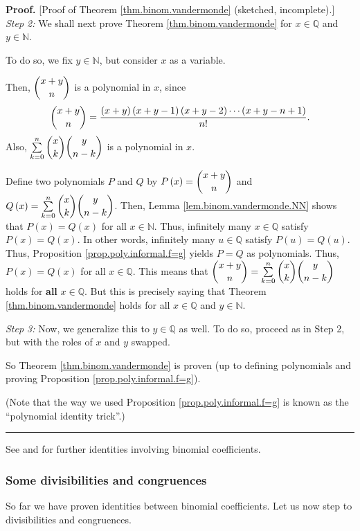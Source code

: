 \documentclass[numbers=enddot,12pt,final,onecolumn,notitlepage]{scrartcl}%
\numberwithin{exer}{subsection}
\theoremstyle{definition}
\newenvironment{proof}[1][Proof]{\noindent\textbf{#1.} }{\ \rule{0.5em}{0.5em}}
\let\sumnonlimits\sum
\renewcommand{\sum}{\sumnonlimits\limits}
\begin{document}
\begin{proof}
[Proof of Theorem \ref{thm.binom.vandermonde} (sketched, incomplete).]%
\textit{Step 2:} We shall next prove Theorem \ref{thm.binom.vandermonde} for
$x\in\mathbb{Q}$ and $y\in\mathbb{N}$.

To do so, we fix $y\in\mathbb{N}$, but consider $x$ as a variable.

Then, $\dbinom{x+y}{n}$ is a polynomial in $x$, since%
\[
\dbinom{x+y}{n}=\dfrac{\left(  x+y\right)  \left(  x+y-1\right)  \left(
x+y-2\right)  \cdots\left(  x+y-n+1\right)  }{n!}.
\]
Also, $\sum\limits_{k=0}^{n}\dbinom{x}{k}\dbinom{y}{n-k}$ is a polynomial in
$x$.

Define two polynomials $P$ and $Q$ by $P\left(  x\right)  =\dbinom{x+y}{n}$
and $Q\left(  x\right)  =\sum_{k=0}^{n}\dbinom{x}{k}\dbinom{y}{n-k}$. Then,
Lemma \ref{lem.binom.vandermonde.NN} shows that $P\left(  x\right)  =Q\left(
x\right)  $ for all $x\in\mathbb{N}$. Thus, infinitely many $x\in\mathbb{Q}$
satisfy $P\left(  x\right)  =Q\left(  x\right)  $. In other words, infinitely
many $u\in\mathbb{Q}$ satisfy $P\left(  u\right)  =Q\left(  u\right)  $. Thus,
Proposition \ref{prop.poly.informal.f=g} yields $P=Q$ as polynomials. Thus,
$P\left(  x\right)  =Q\left(  x\right)  $ for all $x\in\mathbb{Q}$. This means
that $\dbinom{x+y}{n}=\sum\limits_{k=0}^{n}\dbinom{x}{k}\dbinom{y}{n-k}$ holds
for \textbf{all} $x\in\mathbb{Q}$. But this is precisely saying that Theorem
\ref{thm.binom.vandermonde} holds for all $x\in\mathbb{Q}$ and $y\in
\mathbb{N}$.

\textit{Step 3:} Now, we generalize this to $y\in\mathbb{Q}$ as well. To do
so, proceed as in Step 2, but with the roles of $x$ and $y$ swapped.

So Theorem \ref{thm.binom.vandermonde} is proven (up to defining polynomials
and proving Proposition \ref{prop.poly.informal.f=g}).

(Note that the way we used Proposition \ref{prop.poly.informal.f=g} is known
as the \textquotedblleft polynomial identity trick\textquotedblright.)
\end{proof}

See \cite{GKP} and \cite{detnotes} for further identities involving binomial coefficients.

\subsubsection{Some divisibilities and congruences}

So far we have proven identities between binomial coefficients. Let us now
step to divisibilities and congruences.
\end{document}
